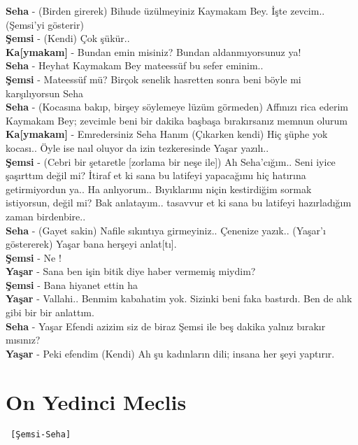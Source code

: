 \documentclass[]{book}
\begin{document}
\textbf{Seha} - (Birden girerek) Bihude üzülmeyiniz Kaymakam Bey. İşte zevcim..(Şemsi'yi gösterir)\\
\textbf{Şemsi} - (Kendi) Çok şükür..\\
\textbf{Ka{[}ymakam{]}} - Bundan emin misiniz? Bundan aldanmıyorsunuz ya!\\
\textbf{Seha} - Heyhat Kaymakam Bey mateessüf bu sefer eminim..\\
\textbf{Şemsi} - Mateessüf mü? Birçok senelik hasretten sonra beni böyle mi karşılıyorsun Seha\\
\textbf{Seha} - (Kocasına bakıp, birşey söylemeye lüzüm görmeden) Affınızı rica ederim Kaymakam Bey; zevcimle beni bir dakika başbaşa bırakırsanız memnun olurum\\
\textbf{Ka{[}ymakam{]}} - Emredersiniz Seha Hanım (Çıkarken kendi) Hiç şüphe yok kocası.. Öyle ise naıl oluyor da izin tezkeresinde Yaşar yazılı..\\
\textbf{Şemsi} - (Cebri bir şetaretle {[}zorlama bir neşe ile{]}) Ah Seha'cığım.. Seni iyice şaşırttım değil mi? İtiraf et ki sana bu latifeyi yapacağımı hiç hatırına getirmiyordun ya.. Ha anlıyorum.. Bıyıklarımı niçin kestirdiğim sormak istiyorsun, değil mi? Bak anlatayım.. tasavvur et ki sana bu latifeyi hazırladığım zaman birdenbire..\\
\textbf{Seha} - (Gayet sakin) Nafile sıkıntıya girmeyiniz.. Çenenize yazık.. (Yaşar'ı göstererek) Yaşar bana herşeyi anlat{[}tı{]}.\\
\textbf{Şemsi} - Ne !\\
\textbf{Yaşar} - Sana ben işin bitik diye haber vermemiş miydim?\\
\textbf{Şemsi} - Bana hiyanet ettin ha\\
\textbf{Yaşar} - Vallahi.. Benmim kabahatim yok. Sizinki beni faka bastırdı. Ben de alık gibi bir bir anlattım.\\
\textbf{Seha} - Yaşar Efendi azizim siz de biraz Şemsi ile beş dakika yalnız bırakır mısınız?\\
\textbf{Yaşar} - Peki efendim (Kendi) Ah şu kadınların dili; insana her şeyi yaptırır.\\

\hypertarget{on-yedinci-meclis-1}{%
\section{On Yedinci Meclis}\label{on-yedinci-meclis-1}}

\begin{verbatim}
 [Şemsi-Seha]
\end{verbatim}
\end{document}
